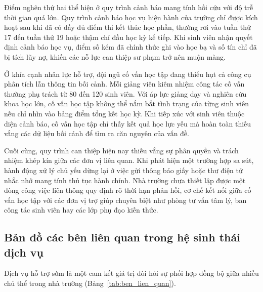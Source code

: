 Điểm nghẽn thứ hai thể hiện ở quy trình cảnh báo mang tính hồi cứu với độ trễ thời gian quá lớn. Quy trình cảnh báo học vụ hiện hành của trường chỉ được kích hoạt sau khi đã có đầy đủ điểm thi kết thúc học phần, thường rơi vào tuần thứ 17 đến tuần thứ 19 hoặc thậm chí đầu học kỳ kế tiếp. Khi sinh viên nhận quyết định cảnh báo học vụ, điểm số kém đã chính thức ghi vào học bạ và số tín chỉ đã bị tích lũy nợ, khiến các nỗ lực can thiệp sư phạm trở nên muộn màng.

Ở khía cạnh nhân lực hỗ trợ, đội ngũ cố vấn học tập đang thiếu hụt cả công cụ phân tích lẫn thông tin bối cảnh. Mỗi giảng viên kiêm nhiệm công tác cố vấn thường phụ trách từ 80 đến 120 sinh viên. Với áp lực giảng dạy và nghiên cứu khoa học lớn, cố vấn học tập không thể nắm bắt tình trạng của từng sinh viên nếu chỉ nhìn vào bảng điểm tổng kết học kỳ. Khi tiếp xúc với sinh viên thuộc diện cảnh báo, cố vấn học tập chỉ thấy kết quả học lực yếu mà hoàn toàn thiếu vắng các dữ liệu bối cảnh để tìm ra căn nguyên của vấn đề.

Cuối cùng, quy trình can thiệp hiện nay thiếu vắng sự phân quyền và trách nhiệm khép kín giữa các đơn vị liên quan. Khi phát hiện một trường hợp sa sút, hành động xử lý chủ yếu dừng lại ở việc gửi thông báo giấy hoặc thư điện tử nhắc nhở mang tính thủ tục hành chính. Nhà trường chưa thiết lập được một dòng công việc liên thông quy định rõ thời hạn phản hồi, cơ chế kết nối giữa cố vấn học tập với các đơn vị trợ giúp chuyên biệt như phòng tư vấn tâm lý, ban công tác sinh viên hay các lớp phụ đạo kiến thức.

\subsection{Bản đồ các bên liên quan trong hệ sinh thái dịch vụ}
Dịch vụ hỗ trợ sớm là một cam kết giá trị đòi hỏi sự phối hợp đồng bộ giữa nhiều chủ thể trong nhà trường (Bảng~\ref{tab:ben_lien_quan}).

